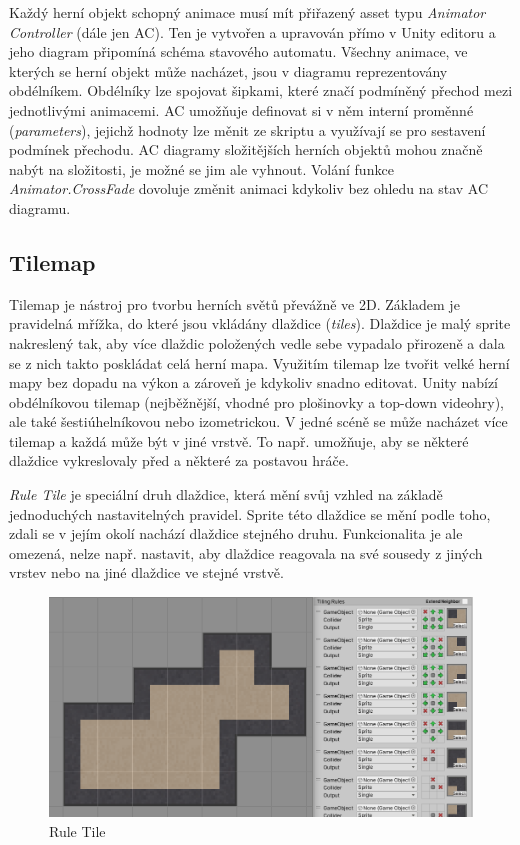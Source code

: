 \documentclass[FM,Proj]{tulthesis}
\begin{document}
	Každý herní objekt schopný animace musí mít přiřazený asset typu \textit{Animator Controller} (dále jen AC). Ten je vytvořen a upravován přímo v Unity editoru a jeho diagram připomíná schéma stavového automatu. Všechny animace, ve kterých se herní objekt může nacházet, jsou v diagramu reprezentovány obdélníkem. Obdélníky lze spojovat šipkami, které značí podmíněný přechod mezi jednotlivými animacemi. AC umožňuje definovat si v něm interní proměnné (\textit{parameters}), jejichž hodnoty lze měnit ze skriptu a využívají se pro sestavení podmínek přechodu. AC diagramy složitějších herních objektů mohou značně nabýt na složitosti, je možné se jim ale vyhnout. Volání funkce \textit{Animator.CrossFade} dovoluje změnit animaci kdykoliv bez ohledu na stav AC diagramu.
	
	\subsection{Tilemap}
	
	Tilemap je nástroj pro tvorbu herních světů převážně ve 2D. Základem je pravidelná mřížka, do které jsou vkládány dlaždice (\textit{tiles}). Dlaždice je malý sprite nakreslený tak, aby více dlaždic položených vedle sebe vypadalo přirozeně a dala se z nich takto poskládat celá herní mapa. Využitím tilemap lze tvořit velké herní mapy bez dopadu na výkon a zároveň je kdykoliv snadno editovat. Unity nabízí obdélníkovou tilemap (nejběžnější, vhodné pro plošinovky a top-down videohry), ale také šestiúhelníkovou nebo izometrickou. V jedné scéně se může nacházet více tilemap a každá může být v jiné vrstvě. To např. umožňuje, aby se některé dlaždice vykreslovaly před a některé za postavou hráče.
	
	\textit{Rule Tile} je speciální druh dlaždice, která mění svůj vzhled na základě jednoduchých nastavitelných pravidel. Sprite této dlaždice se mění podle toho, zdali se v jejím okolí nachází dlaždice stejného druhu. Funkcionalita je ale omezená, nelze např. nastavit, aby dlaždice reagovala na své sousedy z jiných vrstev nebo na jiné dlaždice ve stejné vrstvě.
	
	\begin{figure}[ht]
		\centering
		\includegraphics[width=\textwidth]{img/RuleTile}
		\caption{Rule Tile}
	\end{figure}
	
\end{document}
